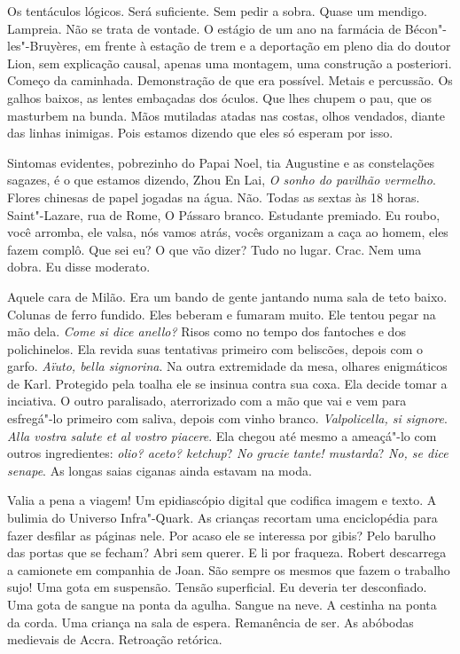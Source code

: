 Os tentáculos lógicos. Será suficiente. Sem pedir a sobra. Quase um
mendigo. Lampreia. Não se trata de vontade. O estágio de um ano na
farmácia de Bécon"-les"-Bruyères, em frente à estação de trem e a
deportação em pleno dia do doutor Lion, sem explicação causal, apenas
uma montagem, uma construção a posteriori. Começo da caminhada.
Demonstração de que era possível. Metais e percussão. Os galhos baixos,
as lentes embaçadas dos óculos. Que lhes chupem o pau, que os masturbem
na bunda. Mãos mutiladas atadas nas costas, olhos vendados, diante das
linhas inimigas. Pois estamos dizendo que eles só esperam por isso.

Sintomas evidentes, pobrezinho do Papai Noel, tia Augustine e as
constelações sagazes, é o que estamos dizendo, Zhou En Lai, \emph{O
sonho do pavilhão vermelho}. Flores chinesas de papel jogadas na água.
Não. Todas as sextas às 18 horas. Saint"-Lazare, rua de Rome, O Pássaro
branco. Estudante premiado. Eu roubo, você arromba, ele valsa, nós vamos
atrás, vocês organizam a caça ao homem, eles fazem complô. Que sei eu? O
que vão dizer? Tudo no lugar. Crac. Nem uma dobra. Eu disse moderato.

Aquele cara de Milão. Era um bando de gente jantando numa sala de teto
baixo. Colunas de ferro fundido. Eles beberam e fumaram muito. Ele
tentou pegar na mão dela. \emph{Come si dice anello?} Risos como no
tempo dos fantoches e dos polichinelos. Ela revida suas tentativas
primeiro com beliscões, depois com o garfo. \emph{Aïuto, bella
signorina}. Na outra extremidade da mesa, olhares enigmáticos de Karl.
Protegido pela toalha ele se insinua contra sua coxa. Ela decide tomar a
inciativa. O outro paralisado, aterrorizado com a mão que vai e vem para
esfregá"-lo primeiro com saliva, depois com vinho branco.
\emph{Valpolicella, si signore}. \emph{Alla vostra salute et al vostro
piacere}. Ela chegou até mesmo a ameaçá"-lo com outros ingredientes:
\emph{olio? aceto? ketchup}? \emph{No gracie tante! mustarda}? \emph{No,
se dice senape}. As longas saias ciganas ainda estavam na moda.

Valia a pena a viagem! Um epidiascópio digital que codifica imagem e
texto. A bulimia do Universo Infra"-Quark. As crianças recortam uma
enciclopédia para fazer desfilar as páginas nele. Por acaso ele se
interessa por gibis? Pelo barulho das portas que se fecham? Abri sem
querer. E li por fraqueza. Robert descarrega a camionete em companhia de
Joan. São sempre os mesmos que fazem o trabalho sujo! Uma gota em
suspensão. Tensão superficial. Eu deveria ter desconfiado. Uma gota de
sangue na ponta da agulha. Sangue na neve. A cestinha na ponta da corda.
Uma criança na sala de espera. Remanência de ser. As abóbodas medievais
de Accra. Retroação retórica.

